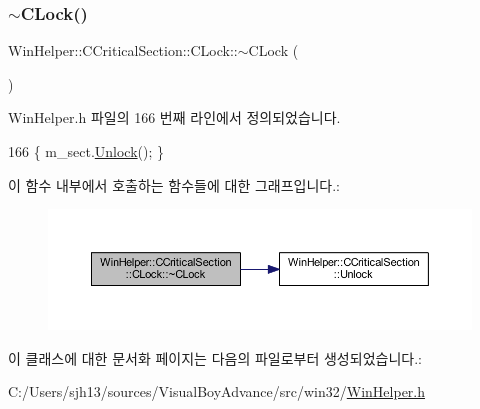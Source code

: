 \subsubsection{\texorpdfstring{$\sim$\+C\+Lock()}{~CLock()}}
{\footnotesize\ttfamily Win\+Helper\+::\+C\+Critical\+Section\+::\+C\+Lock\+::$\sim$\+C\+Lock (\begin{DoxyParamCaption}{ }\end{DoxyParamCaption})\hspace{0.3cm}{\ttfamily [inline]}}



Win\+Helper.\+h 파일의 166 번째 라인에서 정의되었습니다.


\begin{DoxyCode}
166 \{ m\_sect.\mbox{\hyperlink{class_win_helper_1_1_c_critical_section_a32b6fc61701020c400f3bb9b5e00bf12}{Unlock}}(); \}
\end{DoxyCode}
이 함수 내부에서 호출하는 함수들에 대한 그래프입니다.\+:
\nopagebreak
\begin{figure}[H]
\begin{center}
\leavevmode
\includegraphics[width=350pt]{class_win_helper_1_1_c_critical_section_1_1_c_lock_abbd6d830a932e4ba03735171d39afe81_cgraph}
\end{center}
\end{figure}


이 클래스에 대한 문서화 페이지는 다음의 파일로부터 생성되었습니다.\+:\begin{DoxyCompactItemize}
\item 
C\+:/\+Users/sjh13/sources/\+Visual\+Boy\+Advance/src/win32/\mbox{\hyperlink{_win_helper_8h}{Win\+Helper.\+h}}\end{DoxyCompactItemize}

